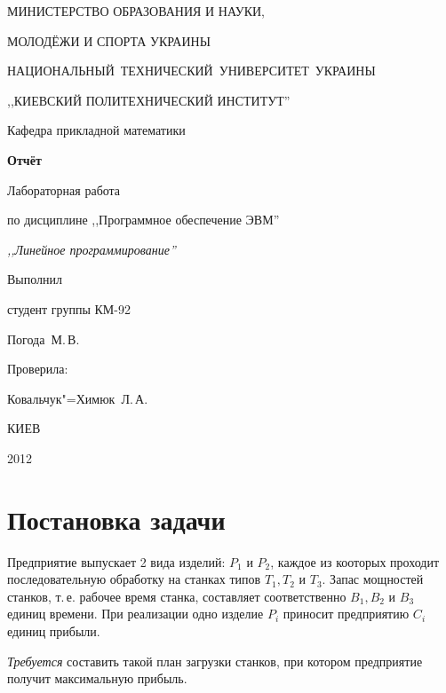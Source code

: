 \documentclass[a4paper,12pt,notitlepage,headsepline,pdftex]{scrartcl}
\begin{document}
\begin{titlepage}
  \begin{center}
    \large
    \MakeUppercase{Министерство образования и науки,}

    \MakeUppercase{молодёжи и спорта Украины}

    \mbox{\MakeUppercase{Национальный технический университет Украины}}

    \MakeUppercase{,,Киевский политехнический институт''}

    \addvspace{6pt}

    \normalsize
    Кафедра прикладной математики

    \vfill

    \textbf{Отчёт}

    Лабораторная работа 

    по дисциплине ,,Программное обеспечение ЭВМ''

    \emph{,,Линейное программирование''}
  \end{center}

  \vfill

  \noindent
  \begin{minipage}{0.3\textwidth}
    Выполнил

    студент группы КМ-92

    Погода~М.\,В.
  \end{minipage}
  \hfill
  \begin{minipage}{0.4\textwidth}
    Проверила:

    Ковальчук"=Химюк~Л.\,А.
  \end{minipage}
  \vfill

  \begin{center}
    КИЕВ

    2012
  \end{center}
\end{titlepage}
\tableofcontents
\newpage
\section{Постановка задачи}
  Предприятие выпускает 2 вида изделий: $P_1$ и $P_2$, каждое из кооторых
  проходит последовательную обработку на станках типов $T_1, T_2$ и $T_3$.
  Запас мощностей станков, т.\,е. рабочее время станка, составляет
  соответственно $B_1, B_2$ и $B_3$ единиц времени.
  При реализации одно изделие $P_i$ приносит предприятию $C_i$ единиц прибыли.

  \textit{Требуется} составить такой план загрузки станков, при котором
  предприятие получит максимальную прибыль.
\end{document}
